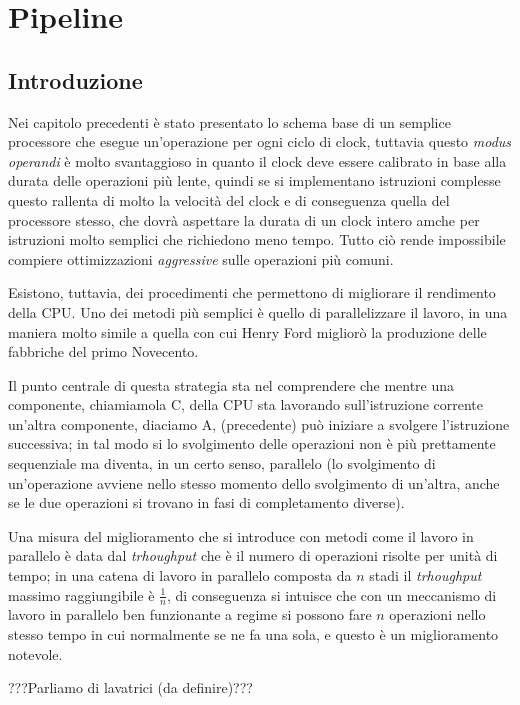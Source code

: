 \documentclass[class=book, crop=false, oneside]{standalone}
\begin{document}
\chapter{Pipeline}

\section{Introduzione}
Nei capitolo precedenti è stato presentato lo schema base di un semplice processore che esegue un'operazione per ogni ciclo di clock, tuttavia questo \emph{modus operandi} è molto svantaggioso in quanto il clock deve essere calibrato in base alla durata delle operazioni più lente, quindi se si implementano istruzioni complesse questo rallenta di molto la velocità del clock e di conseguenza quella del processore stesso, che dovrà aspettare la durata di un clock intero amche per istruzioni molto semplici che richiedono meno tempo.
Tutto ciò rende impossibile compiere ottimizzazioni \emph{aggressive} sulle operazioni più comuni.

Esistono, tuttavia, dei procedimenti che permettono di migliorare il rendimento della CPU.
Uno dei metodi più semplici è quello di parallelizzare il lavoro, in una maniera molto simile a quella con cui Henry Ford migliorò la produzione delle fabbriche del primo Novecento.

Il punto centrale di questa strategia sta nel comprendere che mentre una componente, chiamiamola C, della CPU sta lavorando sull'istruzione corrente un'altra componente, diaciamo A, (precedente) può iniziare a svolgere l'istruzione successiva; in tal modo si lo svolgimento delle operazioni non è più prettamente sequenziale ma diventa, in un certo senso, parallelo (lo svolgimento di un'operazione avviene nello stesso momento dello svolgimento di un'altra, anche se le due operazioni si trovano in fasi di completamento diverse).

Una misura del miglioramento che si introduce con metodi come il lavoro in parallelo è data dal \emph{trhoughput} che è il numero di operazioni risolte per unità di tempo; in una catena di lavoro in parallelo composta da \(n\) stadi il \emph{trhoughput} massimo raggiungibile è \(\frac{1}{n}\), di conseguenza si intuisce che con un meccanismo di lavoro in parallelo ben funzionante a regime si possono fare \(n\) operazioni nello stesso tempo in cui normalmente se ne fa una sola, e questo è un miglioramento notevole.

???Parliamo di lavatrici (da definire)???
\end{document}
